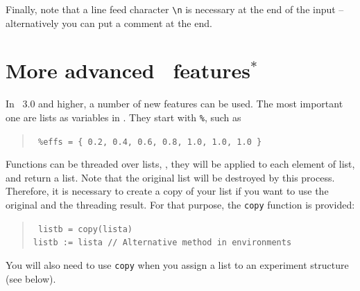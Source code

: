 Finally, note that a line feed character \verb+\n+ is necessary at
 the end of the input -- alternatively you can put a comment at the end.

\section{More advanced \AEDL\ features$^*$}
\label{sec:advaedl}

In \GLOBES\ 3.0 and higher, a number of new features can be used.  The
most important one are lists as variables in \AEDL . They start with {\tt \%}, such as
\begin{quote}
{\tt
\%effs = \{ 0.2, 0.4, 0.6, 0.8, 1.0, 1.0, 1.0 \}
}
\end{quote}
Functions can be threaded over lists, \ie, they will be applied to each element
of list, and return a list. Note that the original list will be destroyed by this
process. Therefore, it is necessary to create a copy of your list if you want to
use the original and the threading result. For that purpose, the {\tt copy}
function is provided:
\begin{quote}
{\tt
 listb = copy(lista) \\
 listb := lista // Alternative method in environments
}
\end{quote}
You will also need to use {\tt copy} when you assign a list to an experiment structure (see below).

